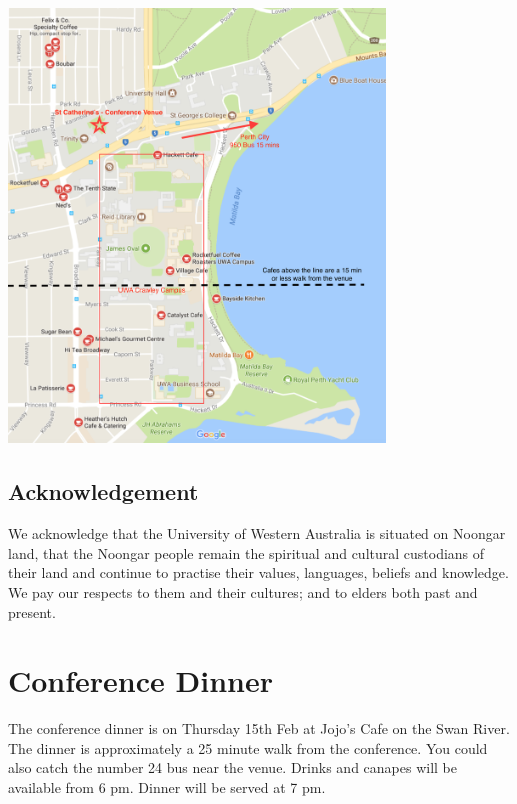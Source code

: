 \documentclass[]{article}
\begin{document}
\begin{center}
\vspace{0.5 cm}
\includegraphics[width=10cm]{images/Venue}
\vspace{0.5 cm}
\end{center}

\subsection{Acknowledgement}\label{acknowledgement}

We acknowledge that the University of Western Australia is situated on
Noongar land, that the Noongar people remain the spiritual and cultural
custodians of their land and continue to practise their values,
languages, beliefs and knowledge. We pay our respects to them and their
cultures; and to elders both past and present.

\section{Conference Dinner}\label{conference-dinner}

The conference dinner is on Thursday 15th Feb at Jojo's Cafe on the Swan
River. The dinner is approximately a 25 minute walk from the conference.
You could also catch the number 24 bus near the venue. Drinks and
canapes will be available from 6 pm. Dinner will be served at 7 pm.
\end{document}
